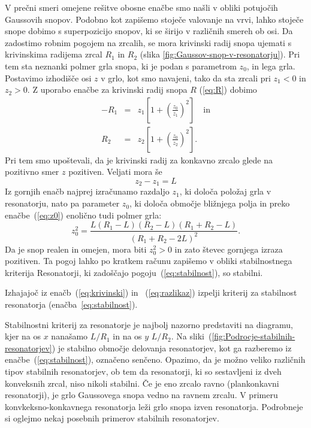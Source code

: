 \noindent
V prečni smeri omejene rešitve obosne enačbe smo našli v obliki potujočih
Gaussovih snopov. Podobno kot zapišemo stoječe valovanje na vrvi, 
lahko stoječe snope dobimo s superpozicijo snopov, ki se širijo v različnih smereh ob osi. 
Da zadostimo robnim pogojem na zrcalih, se mora krivinski radij snopa ujemati s
krivinskima radijema zrcal $R_{1}$ in $R_{2}$ (slika \ref{fig:Gaussov-snop-v-resonatorju}).
Pri tem sta neznanki polmer grla snopa, ki je podan s parametrom $z_{0}$,
in lega grla. Postavimo izhodišče osi $z$ v grlo, kot smo
navajeni, tako da sta zrcali pri $z_{1}<0$ in $z_{2}>0$. Z uporabo enačbe
za krivinski radij snopa $R$ (\ref{eq:R}) dobimo 
\begin{eqnarray}
-R_{1} & = & z_{1}\left[1+\left(\frac{z_{0}}{z_{1}}\right)^{2}\right] \quad \textrm{in}\\
R_{2} & = & z_{2}\left[1+\left(\frac{z_{0}}{z_{2}}\right)^{2}\right].
\label{eq:krivinski}
\end{eqnarray}
Pri tem smo upoštevali, da je krivinski radij za konkavno zrcalo glede na pozitivno smer $z$ pozitiven.
Veljati mora še 
\begin{equation}
z_{2}-z_{1}=L
\label{eq:razlikaz}
\end{equation}
Iz gornjih enačb najprej izračunamo razdaljo $z_{1}$, ki določa
položaj grla v resonatorju, nato pa parameter $z_{0}$, ki določa
območje bližnjega polja in preko enačbe~(\ref{eq:z0}) enolično tudi polmer grla: 
\begin{equation}
z_{0}^{2}=\frac{L(R_{1}-L)(R_{2}-L)(R_{1}+R_{2}-L)}{(R_{1}+R_{2}-2L)^{2}}.
\label{eq:z0_stab}
\end{equation}
Da je snop realen in omejen, mora biti $z_{0}^{2}>0$ in zato števec
gornjega izraza pozitiven. Ta pogoj lahko po kratkem računu zapišemo
v obliki stabilnostnega kriterija
Resonatorji, ki zadoščajo pogoju~(\ref{eq:stabilnost}), so stabilni. \\

\begin{definition}
Izhajajoč iz enačb~(\ref{eq:krivinski}) in ~(\ref{eq:razlikaz}) izpelji 
kriterij za stabilnost resonatorja
(enačba~\ref{eq:stabilnost}).
\end{definition}

\noindent
Stabilnostni kriterij za resonatorje je najbolj nazorno predstaviti na diagramu, 
kjer na os $x$ nanašamo $L/R_{1}$ in na os $y$ $L/R_{2}$. Na 
sliki~(\ref{fig:Podrocje-stabilnih-resonatorjev}) je stabilno območje delovanja 
resonatorjev, kot ga razberemo iz enačbe~(\ref{eq:stabilnost}), označeno senčeno.
Opazimo, da je možno veliko različnih tipov stabilnih resonatorjev, ob tem da 
resonatorji, ki so sestavljeni iz dveh konveksnih zrcal, niso nikoli stabilni.
Če je eno zrcalo ravno (plankonkavni resonatorji), je grlo Gaussovega snopa vedno 
na ravnem zrcalu. V primeru konvkeksno-konkavnega resonatorja leži grlo snopa
izven resonatorja. Podrobneje si oglejmo nekaj posebnih primerov stabilnih resonatorjev. 

